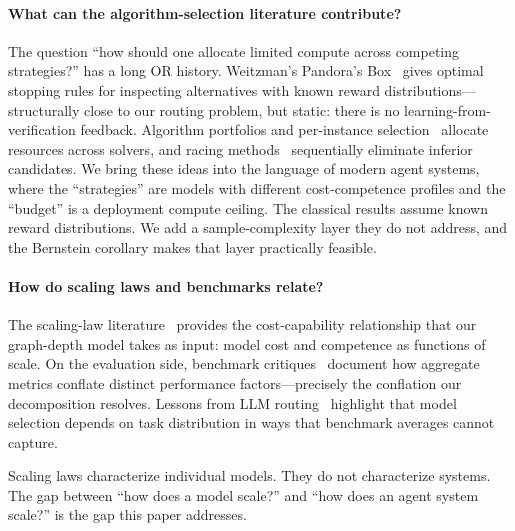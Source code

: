 \paragraph{What can the algorithm-selection literature contribute?}
The question ``how should one allocate limited compute across competing strategies?'' has a long OR history.
Weitzman's Pandora's Box~\citep{kaufmann2016bestarm} gives optimal stopping rules for inspecting alternatives with known reward distributions---structurally close to our routing problem, but static: there is no learning-from-verification feedback.
Algorithm portfolios and per-instance selection~\citep{multiagentdesign2025,qiao2025scaling} allocate resources across solvers, and racing methods~\citep{kaufmann2016bestarm} sequentially eliminate inferior candidates.
We bring these ideas into the language of modern agent systems, where the ``strategies'' are models with different cost-competence profiles and the ``budget'' is a deployment compute ceiling.
The classical results assume known reward distributions.
We add a sample-complexity layer they do not address, and the Bernstein corollary makes that layer practically feasible.

\paragraph{How do scaling laws and benchmarks relate?}
The scaling-law literature~\citep{kaplan2020scaling,hoffmann2022chinchilla} provides the cost-capability relationship that our graph-depth model takes as input: model cost and competence as functions of scale.
On the evaluation side, benchmark critiques~\citep{linegoes2025} document how aggregate metrics conflate distinct performance factors---precisely the conflation our decomposition resolves.
Lessons from LLM routing~\citep{chen2025optimizing} highlight that model selection depends on task distribution in ways that benchmark averages cannot capture.

Scaling laws characterize individual models.
They do not characterize systems.
The gap between ``how does a model scale?'' and ``how does an agent system scale?'' is the gap this paper addresses.

